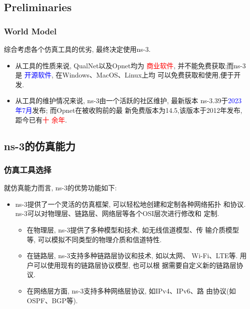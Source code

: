 \documentclass[10pt,mathserif]{beamer}%
\begin{document}
\subsection{Preliminaries}

\begin{frame}[fragile]
	\frametitle{World Model}
	\begin{spacing}{1.5}
		综合考虑各个仿真工具的优劣, 最终决定使用ns-3.
		\begin{itemize}
			\item 从工具的性质来说, QualNet以及Opnet均为
				\textcolor{red}{商业软件}, 并不能免费获取;而ns-3是
				\textcolor{blue}{开源软件}, 在Windows、MacOS、Linux上均
				可以免费获取和使用,便于开发.
			\item 从工具的维护情况来说, ns-3由一个活跃的社区维护, 最新版本
				ns-3.39于\textcolor{blue}{2023年7月}发布; 而Opnet在被收购前的最
				新免费版本为14.5,该版本于2012年发布, 距今已有\textcolor{red}{十
				余年}.
		\end{itemize}
	\end{spacing}
\end{frame}

\subsection{ns-3的仿真能力}

\begin{frame}[fragile]
	\frametitle{仿真工具选择}
	\begin{spacing}{1.5}
		就仿真能力而言, ns-3的优势功能如下:
		\begin{itemize}
			\item ns-3提供了一个灵活的仿真框架, 可以轻松地创建和定制各种网络拓扑
				和协议. ns-3可以对物理层、链路层、网络层等各个OSI层次进行修改和
				定制.
				\begin{itemize}
					\item 在物理层, ns-3提供了多种模型和技术, 如无线信道模型、传
						输介质模型等, 可以模拟不同类型的物理介质和信道特性.
					\item 在链路层, ns-3支持多种链路层协议和技术, 如以太网、
						Wi-Fi、LTE等. 用户可以使用现有的链路层协议模型, 也可以根
						据需要自定义新的链路层协议.
					\item 在网络层方面, ns-3支持多种网络层协议, 如IPv4、IPv6、路
						由协议(如OSPF、BGP等). 
				\end{itemize}
		\end{itemize}
	\end{spacing}
\end{frame}
\end{document}

